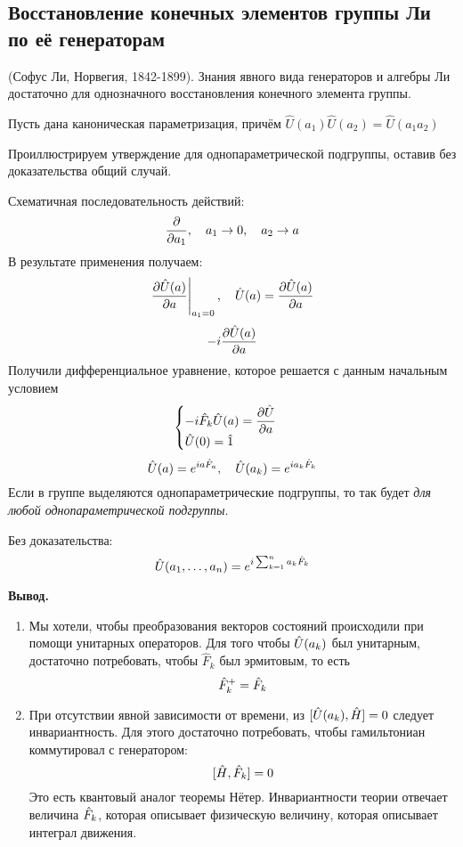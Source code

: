 \subsection{Восстановление конечных элементов группы Ли по её генераторам}

\Th (Софус Ли, Норвегия, 1842-1899). Знания явного вида генераторов и алгебры Ли достаточно для однозначного восстановления конечного элемента группы. 

\Proof Пусть дана каноническая параметризация, причём $\hat U(a_1) \hat U(a_2) = \hat U(a_1 a_2)$

Проиллюстрируем утверждение для однопараметрической подгруппы, оставив без доказательства общий случай.

Схематичная последовательность действий:
$$
    \dfrac{\partial }{\partial a_1}, \quad a_1 \to 0, \quad a_2 \to a
$$
В результате применения получаем:
$$
    \left.\dfrac{\partial \Hat U(a)}{\partial a}\right|_{a_1 = 0}, \quad \Hat U(a) = \dfrac{\partial \Hat U(a)}{\partial a}
$$
$$
    -i \dfrac{\partial \Hat U (a)}{\partial a}
$$
Получили дифференциальное уравнение, которое решается с данным начальным условием
$$
    \begin{cases}
        -i \Hat F_k \Hat U(a) = \dfrac{\partial \hat U}{\partial a}\\
        \Hat U(0) = \Hat 1
    \end{cases}
$$
$$
    \Hat U(a) = e^{i a \hat F_a}, \quad \Hat U(a_k) = e^{i a_k \Hat F_k}
$$
Если в группе выделяются однопараметрические подгруппы, то так будет \emph{для любой однопараметрической подгруппы}.

Без доказательства:
$$
    \Hat U(a_1, \ldots, a_n) = e^{i \sum_{k=1}^{n} a_k \Hat F_k}
$$

\textbf{Вывод.}
\begin{enumerate}
  \item Мы хотели, чтобы преобразования векторов состояний происходили при помощи унитарных операторов. Для того чтобы $\Hat U(a_k)$ был унитарным, достаточно потребовать, чтобы $\hat F_k$ был эрмитовым, то есть
$$
    \Hat F_k^+ = \Hat F_k
$$
  \item При отсутствии явной зависимости от времени, из $[\hat U(a_k), \Hat H] = 0$ следует инвариантность. Для этого достаточно потребовать, чтобы гамильтониан коммутировал с генератором:
      $$
            [\hat H, \Hat F_k] = 0
      $$
      Это есть квантовый аналог теоремы Нётер. Инвариантности теории отвечает величина $\Hat F_k$, которая описывает физическую величину, которая описывает интеграл движения.
\end{enumerate}
